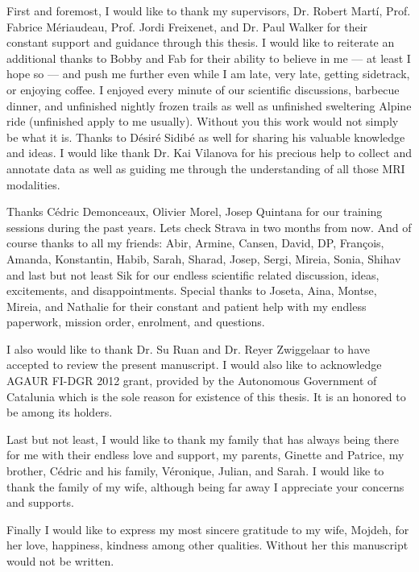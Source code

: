

\begin{acknowledgements}      %
First and foremost, I would like to thank my supervisors, Dr. Robert Mart\'i, Prof. Fabrice M\'eriaudeau, Prof. Jordi Freixenet, and Dr. Paul Walker for their constant support and guidance through this thesis.
I would like to reiterate an additional thanks to Bobby and Fab for their ability to believe in me --- at least I hope so --- and push me further even while I am late, very late, getting sidetrack, or enjoying coffee.
I enjoyed every minute of our scientific discussions, barbecue dinner, and unfinished nightly frozen trails as well as unfinished sweltering Alpine ride (unfinished apply to me usually).
Without you this work would not simply be what it is. 
Thanks to D\'esir\'e Sidib\'e as well for sharing his valuable knowledge and ideas.
I would like thank Dr. Kai Vilanova for his precious help to collect and annotate data as well as guiding me through the understanding of all those MRI modalities.

Thanks C\'edric Demonceaux, Olivier Morel, Josep Quintana for our training sessions during the past years.
Lets check Strava in two months from now.
And of course thanks to all my friends: Abir, Armine, Cansen, David, DP, Fran\c{c}ois, Amanda, Konstantin, Habib, Sarah, Sharad, Josep, Sergi, Mireia, Sonia, Shihav and last but not least Sik for our endless scientific related discussion, ideas, excitements, and disappointments.
Special thanks to Joseta, Aina, Montse, Mireia, and Nathalie for their constant and patient help with my endless paperwork, mission order, enrolment, and questions.

I also would like to thank Dr. Su Ruan and Dr. Reyer Zwiggelaar to have accepted to review the present manuscript.
I would also like to acknowledge AGAUR FI-DGR 2012 grant, provided by the Autonomous Government of Catalunia which is the sole reason for existence of this thesis.
It is an honored to be among its holders.


Last but not least, I would like to thank my family that has always being there for me with their endless love and support, my parents, Ginette and Patrice, my brother, C\'edric and his family, V\'eronique, Julian, and Sarah.
I would like to thank the family of my wife, although being far away I appreciate your concerns and supports. 

Finally I would like to express my most sincere gratitude to my wife, Mojdeh, for her love, happiness, kindness among other qualities.
Without her this manuscript would not be written.
   

\end{acknowledgements}



